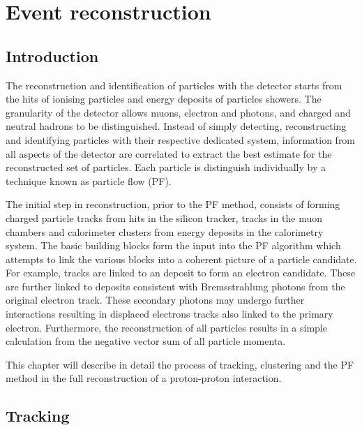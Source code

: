 \chapter{Event reconstruction}\label{chap:reconstruction}


\section{Introduction}

The reconstruction and identification of particles with the \CMS detector starts from the hits of ionising particles and energy deposits of particles showers. The granularity of the \CMS detector allows muons, electron and photons, and charged and neutral hadrons to be distinguished. Instead of simply detecting, reconstructing and identifying particles with their respective dedicated system, information from all aspects of the detector are correlated to extract the best estimate for the reconstructed set of particles. Each particle is distinguish individually by a technique known as particle flow (PF).

The initial step in reconstruction, prior to the PF method, consists of forming charged particle tracks from hits in the silicon tracker, tracks in the muon chambers and calorimeter clusters from energy deposits in the calorimetry system. The basic building blocks form the input into the PF algorithm which attempts to link the various blocks into a coherent picture of a particle candidate. For example, tracks are linked to an \ECAL deposit to form an electron candidate. These are further linked to \ECAL deposits consistent with Bremsstrahlung photons from the original electron track. These secondary photons may undergo further interactions resulting in displaced electrons tracks also linked to the primary electron. Furthermore, the reconstruction of all particles results in a simple \ptmiss calculation from the negative vector sum of all particle momenta.

This chapter will describe in detail the process of tracking, clustering and the PF method in the full reconstruction of a proton-proton interaction.


\section{Tracking}

